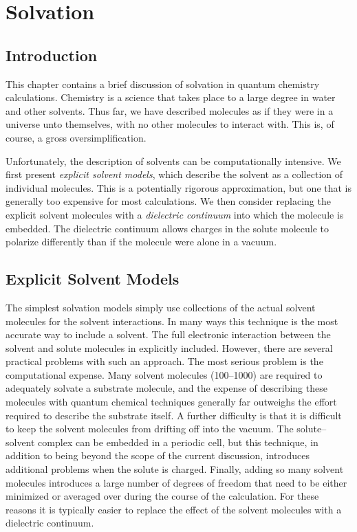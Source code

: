\chapter{Solvation}

\section{Introduction}
This chapter contains a brief discussion of solvation in quantum
chemistry calculations. Chemistry is a science that takes place to a
large degree in water and other solvents. Thus far, we have described
molecules as if they were in a universe unto themselves, with no other
molecules to interact with. This is, of course, a gross
oversimplification. 

Unfortunately, the description of solvents can be computationally
intensive. We first present \emph{explicit solvent models}, which
describe the solvent as a collection of individual molecules. This is
a potentially rigorous approximation, but one that is generally too
expensive for most calculations. We then consider replacing the
explicit solvent molecules with a \emph{dielectric continuum} into
which the molecule is embedded. The dielectric continuum allows
charges in the solute molecule to polarize differently than if the
molecule were alone in a vacuum.

\section{Explicit Solvent Models}

The simplest solvation models simply use collections of the actual
solvent molecules for the solvent interactions. In many ways this
technique is the most accurate way to include a solvent. The full
electronic interaction between the solvent and solute molecules in
explicitly included. However, there are several practical problems
with such an approach. The most serious problem is the computational
expense. Many solvent molecules (100--1000) are required to adequately
solvate a substrate molecule, and the expense of describing these
molecules with quantum chemical techniques generally far outweighs the
effort required to describe the substrate itself. A further difficulty
is that it is difficult to keep the solvent molecules from drifting
off into the vacuum. The solute--solvent complex can be embedded in a
periodic cell, but this technique, in addition to being beyond the
scope of the current discussion, introduces additional problems when
the solute is charged. Finally, adding so many solvent molecules
introduces a large number of degrees of freedom that need to be either
minimized or averaged over during the course of the calculation. For
these reasons it is typically easier to replace the effect of the
solvent molecules with a dielectric continuum.

